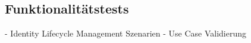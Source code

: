 \subsection{Funktionalitätstests} \label{sec:Funktionalitätstests}

- Identity Lifecycle Management Szenarien
- Use Case Validierung